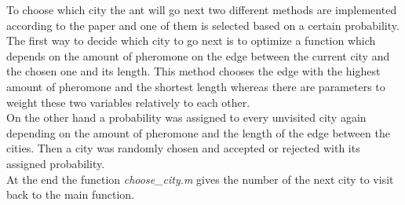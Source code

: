 To choose which city the ant will go next two different methods are implemented according to the paper and one of them is selected based on a certain probability. \\
The first way to decide which city to go next is to optimize a function which depends on the amount of pheromone on the edge between the current city and the chosen one and its length. This method chooses the edge with the highest amount of pheromone and the shortest length whereas there are parameters to weight these two variables relatively to each other. \\
On the other hand a probability was assigned to every unvisited city again depending on the amount of pheromone and the length of the edge between the cities. Then a city was randomly chosen and accepted or rejected with its assigned probability.\\
At the end the function \textit{choose\_city.m} gives the number of the next city to visit back to the main function.